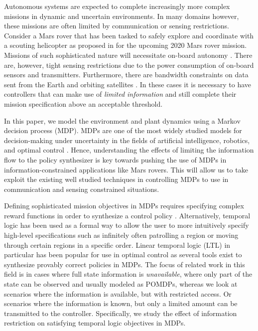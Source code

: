 Autonomous systems are expected to complete increasingly more complex missions in dynamic and uncertain environments. In many domains however, these missions are often limited by communication or sensing restrictions. Consider a Mars rover that has been tasked to safely explore and coordinate with a scouting helicopter as proposed in \cite{landau2015helicopter} for the upcoming 2020 Mars rover mission. Missions of such sophisticated nature will necessitate on-board autonomy \cite{francis2017advanced,estlin2007increased}. There are, however, tight sensing restrictions due to the power consumption of on-board sensors and transmitters. Furthermore, there are bandwidth constraints on data sent from the Earth and orbiting satellites \cite{sherwood2014,Backes1999}. In these cases it is necessary to have controllers that can make use of \emph{limited information} and still complete their mission specification above an acceptable threshold. %

In this paper, we model the environment and plant dynamics using a Markov decision process (MDP). MDPs are one of the most widely studied models for decision-making under uncertainty in the fields of artificial intelligence, robotics, and optimal control \cite{Papadimitriou87,Fu15}. Hence, understanding the effects of limiting the information flow to the policy synthesizer is key towards pushing the use of MDPs in information-constrained applications like Mars rovers. This will allow us to take exploit the existing well studied techniques in controlling MDPs to use in communication and sensing constrained situations. 

Defining sophisticated mission objectives in MDPs requires specifying complex reward functions in order to synthesize a control policy \cite{puterman2014}. Alternatively, temporal logic has been used as a formal way to allow the user to more intuitively specify high-level specifications such as infinitely often patrolling a region or moving through certain regions in a specific order. Linear temporal logic (LTL) in particular has been popular for use in optimal control \cite{Svoreňová13,Fu15} as several tools exist to synthesize provably correct policies in MDPs. %
The focus of related work in this field is in cases where full state information is \emph{unavailable}, \ie where only part of the state can be observed and usually modeled as POMDPs, whereas we look at scenarios where the information is available, but with restricted access. Or scenarios where the information is known, but only a limited amount can be transmitted to the controller. Specifically, we study the effect of information restriction on satisfying temporal logic objectives in MDPs.

